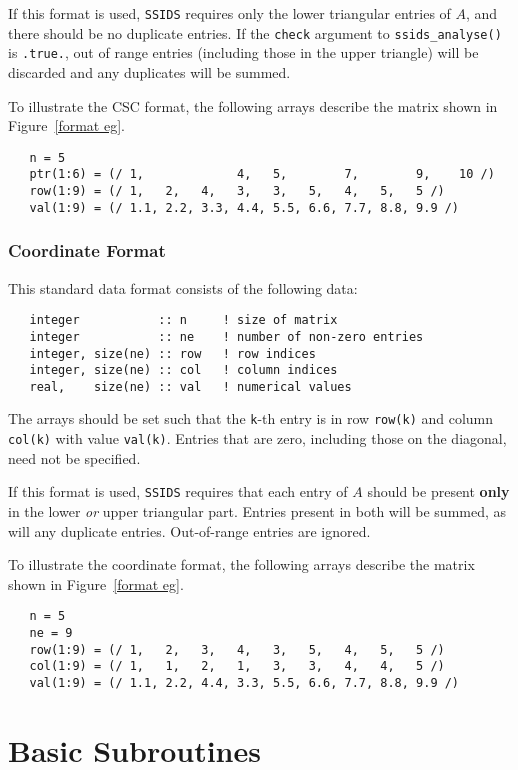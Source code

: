 If this format is used, \texttt{SSIDS} requires only the lower triangular entries of $A$, and there 
should be no duplicate entries. If the \texttt{check}
argument to
\texttt{ssids\_analyse()} is \texttt{.true.}, out of range entries (including
those in the upper triangle) will be discarded and any duplicates will be
summed.

To illustrate the CSC format, the following arrays describe the matrix shown in
Figure~\ref{format eg}.
\begin{verbatim}
   n = 5
   ptr(1:6) = (/ 1,             4,   5,        7,        9,    10 /)
   row(1:9) = (/ 1,   2,   4,   3,   3,   5,   4,   5,   5 /)
   val(1:9) = (/ 1.1, 2.2, 3.3, 4.4, 5.5, 6.6, 7.7, 8.8, 9.9 /)
\end{verbatim}

\subsubsection{Coordinate Format} \label{coordformat}
This standard data format consists of the following data:
\begin{verbatim}
   integer           :: n     ! size of matrix
   integer           :: ne    ! number of non-zero entries
   integer, size(ne) :: row   ! row indices
   integer, size(ne) :: col   ! column indices
   real,    size(ne) :: val   ! numerical values
\end{verbatim}
The arrays should be set such that the \texttt{k}-th entry is in row
\texttt{row(k)} and column \texttt{col(k)} with value \texttt{val(k)}.
Entries that are zero, including those on the diagonal, need not be specified.

If this format is used,
\texttt{SSIDS} requires that each entry of $A$ should be present \textbf{only} in the
lower \textit{or} upper triangular part. Entries present in both will be summed, as
will any duplicate entries. Out-of-range entries are ignored.

To illustrate the coordinate format, the following arrays describe the matrix shown in
Figure~\ref{format eg}.
\begin{verbatim}
   n = 5
   ne = 9
   row(1:9) = (/ 1,   2,   3,   4,   3,   5,   4,   5,   5 /)
   col(1:9) = (/ 1,   1,   2,   1,   3,   3,   4,   4,   5 /)
   val(1:9) = (/ 1.1, 2.2, 4.4, 3.3, 5.5, 6.6, 7.7, 8.8, 9.9 /)
\end{verbatim}


\section{Basic Subroutines}

